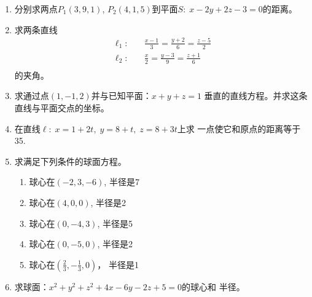 \begin{enumerate}
\item 分别求两点$P_1(3,9,1)$, $P_2(4,1,5)$到平面$S:\;
x-2y+2z-3=0$的距离。
\item 求两条直线
\[\begin{split}
    \ell_1:&\quad \frac{x-1}{3}=\frac{y+2}{6}=\frac{z-5}{2}\\
    \ell_2:&\quad \frac{x}{2}=\frac{y-3}{9}=\frac{z+1}{6}\\
\end{split}\]
的夹角。
\item 求通过点$(1,-1,2)$并与已知平面：$x+y+z=1$
垂直的直线方程。并求这条直线与平面交点的坐标。
\item 在直线$\ell:\; x=1+2t,\; y=8+t,\; z=8+3t$上求
一点使它和原点的距离等于35.
\item 求满足下列条件的球面方程。
\begin{multicols}{2}
    \begin{enumerate}
    \item 球心在$(-2,3,-6)$, 半径是7
    \item 球心在$(4,0,0)$, 半径是2
    \item 球心在$(0,-4,3)$, 半径是5
    \item 球心在$(0,-5,0)$, 半径是2
    \item 球心在$\left(\frac{2}{3},-\frac{1}{3},0\right)$，
半径是1
\end{enumerate}
\end{multicols}

\item 求球面：$x^2+y^2+z^2+4x-6y-2z+5=0$的球心和
半径。
\end{enumerate}

